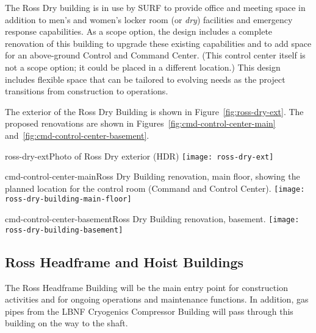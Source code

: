 The Ross Dry building is in use by SURF to provide office and meeting space in addition to men's and women's locker room (or \textit{dry}) facilities and emergency response capabilities. As a scope option, the design includes a complete renovation of this building to upgrade these existing capabilities and to add space for an above-ground Control and Command Center.  (This control center itself is not a scope option; it could be placed in a different location.)  This design includes flexible space that can be tailored to %
evolving needs as the project transitions from construction to operations. 

The exterior of the Ross Dry Building is shown in Figure~\ref{fig:ross-dry-ext}. The proposed renovations are shown in Figures~\ref{fig:cmd-control-center-main} and~\ref{fig:cmd-control-center-basement}.

\begin{cdrfigure}{ross-dry-ext}{Photo of Ross Dry exterior (HDR) }
\texttt{[image: ross-dry-ext]}
\end{cdrfigure}

\begin{cdrfigure}{cmd-control-center-main}{Ross Dry Building renovation, main floor, showing the planned location for the control room (Command and Control Center). %
}
\texttt{[image: ross-dry-building-main-floor]}
\end{cdrfigure}

\begin{cdrfigure}{cmd-control-center-basement}{Ross Dry  Building renovation, basement.}
\texttt{[image: ross-dry-building-basement]}
\end{cdrfigure}


\subsection{Ross Headframe and Hoist Buildings}
\label{sec:fscf-surf-facil-surface-bldg-rosshead}

The Ross Headframe Building will be the main entry point for construction activities and for ongoing operations and maintenance functions. In addition, gas pipes from the LBNF Cryogenics Compressor Building will pass through this building on the way to the shaft.

